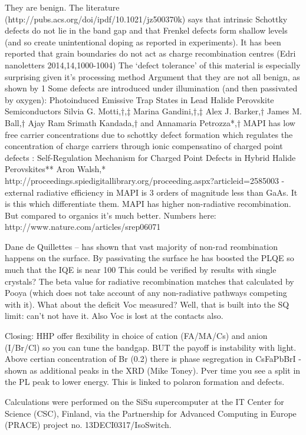 They are benign. The literature (http://pubs.acs.org/doi/ipdf/10.1021/jz500370k) says that intrinsic Schottky defects do not lie in the band gap and that Frenkel defects form shallow levels (and so create unintentional doping as reported in experiments). 
It has been reported that grain boundaries do not act as charge recombination centres (Edri nanoletters 2014,14,1000-1004)
The `defect tolerance’ of this material is especially surprising given it’s processing method
Argument that they are not all benign, as shown by 1%
Some defects are introduced under illumination (and then passivated by oxygen): Photoinduced Emissive Trap States in Lead Halide Perovskite Semiconductors Silvia G. Motti,†,‡ Marina Gandini,†,‡ Alex J. Barker,† James M. Ball,† Ajay Ram Srimath Kandada,† and Annamaria Petrozza*,† 
MAPI has low free carrier concentrations due to schottky defect formation which regulates the concentration of charge carriers through ionic compensatino of charged point defects : Self-Regulation Mechanism for Charged Point Defects in Hybrid Halide Perovskites** Aron Walsh,* 
http://proceedings.spiedigitallibrary.org/proceeding.aspx?articleid=2585003 - external radiative efficiency in MAPI is 3 orders of magnitude less than GaAs. It is this which differentiate them. MAPI has higher non-radiative recombination. But compared to organics it’s much better. Numbers here: http://www.nature.com/articles/srep06071

Dane de Quillettes – has shown that vast majority of non-rad reombination happens on the surface. By passivating the surface he has boosted the PLQE so much that the IQE is near 100%
This could be verified by results with single crystals?
The beta value for radiative recombination matches that calculated by Pooya (which does not take account of any non-radiative pathways competing with it).
What about the deficit Voc measured? Well, that is built into the SQ limit: can’t not have it. Also Voc is lost at the contacts also.

Closing: HHP offer flexibility in choice of cation (FA/MA/Cs) and anion (I/Br/Cl) so you can tune the bandgap. BUT the payoff is instability with light. Above certian concentration of Br (0.2) there is phase segregation in CsFaPbBrI - shown as additional peaks in the XRD (Mike Toney). Pver time you see a split in the PL peak to lower energy. This is linked to polaron formation and defects.


Calculations were performed on the SiSu supercomputer at the IT Center for Science (CSC), Finland, via the Partnership for Advanced Computing in Europe (PRACE) project no. 13DECI0317/IsoSwitch.